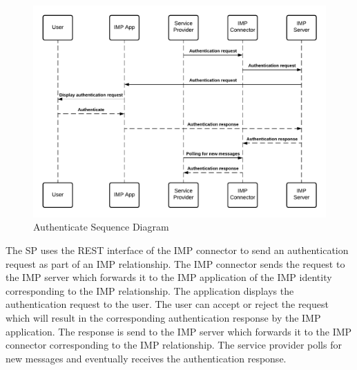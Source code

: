 \begin{figure}[H]
    \centering
    \includegraphics[scale=0.6]{Diagrams/IMP Use Case Authenticate Sequence Diagram.pdf}
    \caption{Authenticate Sequence Diagram}
    \label{imp:authenticate}
\end{figure}

The SP uses the REST interface of the IMP connector to send an authentication request as part of an IMP relationship. The IMP connector sends the request to the IMP server which forwards it to the IMP application of the IMP identity corresponding to the IMP relationship. The application displays the authentication request to the user. The user can accept or reject the request which will result in the corresponding authentication response by the IMP application. The response is send to the IMP server which forwards it to the IMP connector corresponding to the IMP relationship. The service provider polls for new messages and eventually receives the authentication response.